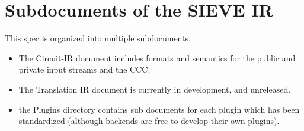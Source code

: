 \section{Subdocuments of the SIEVE IR}
This spec is organized into multiple subdocuments.

\begin{itemize}
  \item The Circuit-IR document includes formats and semantics for the public and private input streams and the CCC.
  \item The Translation IR document is currently in development, and unreleased.
  \item the Plugins directory contains sub documents for each plugin which has been standardized (although backends are free to develop their own plugins).
\end{itemize}
